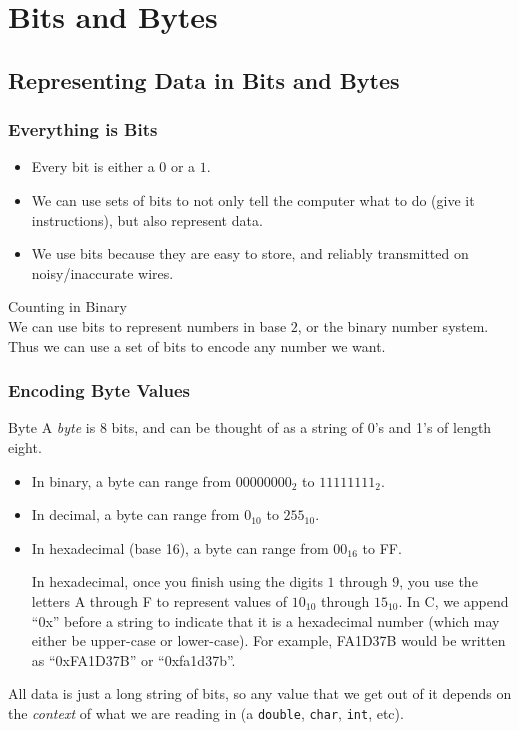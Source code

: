 \documentclass[class=article, crop=false]{standalone}
\begin{document}
  \section{Bits and Bytes}
  \subsection{Representing Data in Bits and Bytes}
  \subsubsection{Everything is Bits}
  \begin{itemize}
    \item Every bit is either a $0$ or a $1$.
    \item We can use sets of bits to not only tell the computer what to do (give it instructions), but also represent data.
    \item We use bits because they are easy to store, and reliably transmitted on noisy/inaccurate wires.
  \end{itemize}
  \begin{example}{Counting in Binary} \\
    We can use bits to represent numbers in base $2$, or the binary number system. Thus we can use a set of bits to encode any number we want.
  \end{example}
  \subsubsection{Encoding Byte Values}
  \begin{definition}{Byte}
    A \emph{byte} is $8$ bits, and can be thought of as a string of 0's and 1's of length eight.
  \end{definition}
  \begin{itemize}
    \item In binary, a byte can range from $00000000_2$ to $11111111_2$.
    \item In decimal, a byte can range from $0_{10}$ to $255_{10}$.
    \item In hexadecimal (base 16), a byte can range from $00_{16}$ to FF.
    \begin{note}{}
      In hexadecimal, once you finish using the digits $1$ through $9$, you use the letters A through F to represent values of $10_{10}$ through $15_{10}$. In C, we append ``0x'' before a string to indicate that it is a hexadecimal number (which may either be upper-case or lower-case). For example, FA1D37B would be written as ``0xFA1D37B'' or ``0xfa1d37b''.
    \end{note}
  \end{itemize}
  All data is just a long string of bits, so any value that we get out of it depends on the \emph{context} of what we are reading in (a \texttt{double}, \texttt{char}, \texttt{int}, etc).
\end{document}
